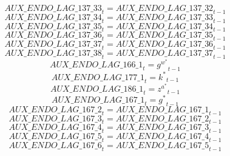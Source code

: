 \begin{dmath}
{AUX\_ENDO\_LAG\_137\_33}_{t}={AUX\_ENDO\_LAG\_137\_32}_{t-1}
\end{dmath}
\begin{dmath}
{AUX\_ENDO\_LAG\_137\_34}_{t}={AUX\_ENDO\_LAG\_137\_33}_{t-1}
\end{dmath}
\begin{dmath}
{AUX\_ENDO\_LAG\_137\_35}_{t}={AUX\_ENDO\_LAG\_137\_34}_{t-1}
\end{dmath}
\begin{dmath}
{AUX\_ENDO\_LAG\_137\_36}_{t}={AUX\_ENDO\_LAG\_137\_35}_{t-1}
\end{dmath}
\begin{dmath}
{AUX\_ENDO\_LAG\_137\_37}_{t}={AUX\_ENDO\_LAG\_137\_36}_{t-1}
\end{dmath}
\begin{dmath}
{AUX\_ENDO\_LAG\_137\_38}_{t}={AUX\_ENDO\_LAG\_137\_37}_{t-1}
\end{dmath}
\begin{dmath}
{AUX\_ENDO\_LAG\_166\_1}_{t}={{g^w^*}}_{t-1}
\end{dmath}
\begin{dmath}
{AUX\_ENDO\_LAG\_177\_1}_{t}={{k^*}}_{t-1}
\end{dmath}
\begin{dmath}
{AUX\_ENDO\_LAG\_186\_1}_{t}={{z^a^*}}_{t-1}
\end{dmath}
\begin{dmath}
{AUX\_ENDO\_LAG\_167\_1}_{t}={{g^*}}_{t-1}
\end{dmath}
\begin{dmath}
{AUX\_ENDO\_LAG\_167\_2}_{t}={AUX\_ENDO\_LAG\_167\_1}_{t-1}
\end{dmath}
\begin{dmath}
{AUX\_ENDO\_LAG\_167\_3}_{t}={AUX\_ENDO\_LAG\_167\_2}_{t-1}
\end{dmath}
\begin{dmath}
{AUX\_ENDO\_LAG\_167\_4}_{t}={AUX\_ENDO\_LAG\_167\_3}_{t-1}
\end{dmath}
\begin{dmath}
{AUX\_ENDO\_LAG\_167\_5}_{t}={AUX\_ENDO\_LAG\_167\_4}_{t-1}
\end{dmath}
\begin{dmath}
{AUX\_ENDO\_LAG\_167\_6}_{t}={AUX\_ENDO\_LAG\_167\_5}_{t-1}
\end{dmath}
